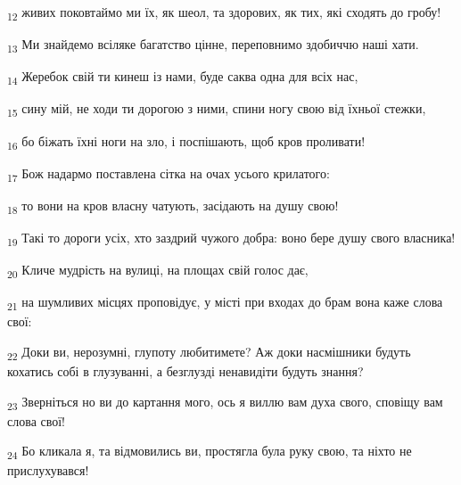 \begin{tcolorbox}
\textsubscript{12} живих поковтаймо ми їх, як шеол, та здорових, як тих, які сходять до гробу!
\end{tcolorbox}
\begin{tcolorbox}
\textsubscript{13} Ми знайдемо всіляке багатство цінне, переповнимо здобиччю наші хати.
\end{tcolorbox}
\begin{tcolorbox}
\textsubscript{14} Жеребок свій ти кинеш із нами, буде саква одна для всіх нас,
\end{tcolorbox}
\begin{tcolorbox}
\textsubscript{15} сину мій, не ходи ти дорогою з ними, спини ногу свою від їхньої стежки,
\end{tcolorbox}
\begin{tcolorbox}
\textsubscript{16} бо біжать їхні ноги на зло, і поспішають, щоб кров проливати!
\end{tcolorbox}
\begin{tcolorbox}
\textsubscript{17} Бож надармо поставлена сітка на очах усього крилатого:
\end{tcolorbox}
\begin{tcolorbox}
\textsubscript{18} то вони на кров власну чатують, засідають на душу свою!
\end{tcolorbox}
\begin{tcolorbox}
\textsubscript{19} Такі то дороги усіх, хто заздрий чужого добра: воно бере душу свого власника!
\end{tcolorbox}
\begin{tcolorbox}
\textsubscript{20} Кличе мудрість на вулиці, на площах свій голос дає,
\end{tcolorbox}
\begin{tcolorbox}
\textsubscript{21} на шумливих місцях проповідує, у місті при входах до брам вона каже слова свої:
\end{tcolorbox}
\begin{tcolorbox}
\textsubscript{22} Доки ви, нерозумні, глупоту любитимете? Аж доки насмішники будуть кохатись собі в глузуванні, а безглузді ненавидіти будуть знання?
\end{tcolorbox}
\begin{tcolorbox}
\textsubscript{23} Зверніться но ви до картання мого, ось я виллю вам духа свого, сповіщу вам слова свої!
\end{tcolorbox}
\begin{tcolorbox}
\textsubscript{24} Бо кликала я, та відмовились ви, простягла була руку свою, та ніхто не прислухувався!
\end{tcolorbox}
